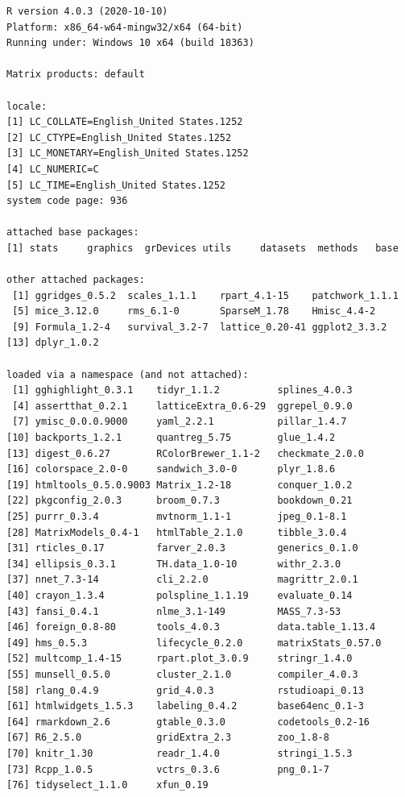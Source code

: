 \documentclass[]{interact}
\theoremstyle{plain}%
\theoremstyle{definition}
\theoremstyle{remark}
\begin{document}
\begin{verbatim}
R version 4.0.3 (2020-10-10)
Platform: x86_64-w64-mingw32/x64 (64-bit)
Running under: Windows 10 x64 (build 18363)

Matrix products: default

locale:
[1] LC_COLLATE=English_United States.1252 
[2] LC_CTYPE=English_United States.1252   
[3] LC_MONETARY=English_United States.1252
[4] LC_NUMERIC=C                          
[5] LC_TIME=English_United States.1252    
system code page: 936

attached base packages:
[1] stats     graphics  grDevices utils     datasets  methods   base     

other attached packages:
 [1] ggridges_0.5.2  scales_1.1.1    rpart_4.1-15    patchwork_1.1.1
 [5] mice_3.12.0     rms_6.1-0       SparseM_1.78    Hmisc_4.4-2    
 [9] Formula_1.2-4   survival_3.2-7  lattice_0.20-41 ggplot2_3.3.2  
[13] dplyr_1.0.2    

loaded via a namespace (and not attached):
 [1] gghighlight_0.3.1    tidyr_1.1.2          splines_4.0.3       
 [4] assertthat_0.2.1     latticeExtra_0.6-29  ggrepel_0.9.0       
 [7] ymisc_0.0.0.9000     yaml_2.2.1           pillar_1.4.7        
[10] backports_1.2.1      quantreg_5.75        glue_1.4.2          
[13] digest_0.6.27        RColorBrewer_1.1-2   checkmate_2.0.0     
[16] colorspace_2.0-0     sandwich_3.0-0       plyr_1.8.6          
[19] htmltools_0.5.0.9003 Matrix_1.2-18        conquer_1.0.2       
[22] pkgconfig_2.0.3      broom_0.7.3          bookdown_0.21       
[25] purrr_0.3.4          mvtnorm_1.1-1        jpeg_0.1-8.1        
[28] MatrixModels_0.4-1   htmlTable_2.1.0      tibble_3.0.4        
[31] rticles_0.17         farver_2.0.3         generics_0.1.0      
[34] ellipsis_0.3.1       TH.data_1.0-10       withr_2.3.0         
[37] nnet_7.3-14          cli_2.2.0            magrittr_2.0.1      
[40] crayon_1.3.4         polspline_1.1.19     evaluate_0.14       
[43] fansi_0.4.1          nlme_3.1-149         MASS_7.3-53         
[46] foreign_0.8-80       tools_4.0.3          data.table_1.13.4   
[49] hms_0.5.3            lifecycle_0.2.0      matrixStats_0.57.0  
[52] multcomp_1.4-15      rpart.plot_3.0.9     stringr_1.4.0       
[55] munsell_0.5.0        cluster_2.1.0        compiler_4.0.3      
[58] rlang_0.4.9          grid_4.0.3           rstudioapi_0.13     
[61] htmlwidgets_1.5.3    labeling_0.4.2       base64enc_0.1-3     
[64] rmarkdown_2.6        gtable_0.3.0         codetools_0.2-16    
[67] R6_2.5.0             gridExtra_2.3        zoo_1.8-8           
[70] knitr_1.30           readr_1.4.0          stringi_1.5.3       
[73] Rcpp_1.0.5           vctrs_0.3.6          png_0.1-7           
[76] tidyselect_1.1.0     xfun_0.19           
\end{verbatim}

\pagebreak

\nocite{*}



\end{document}
